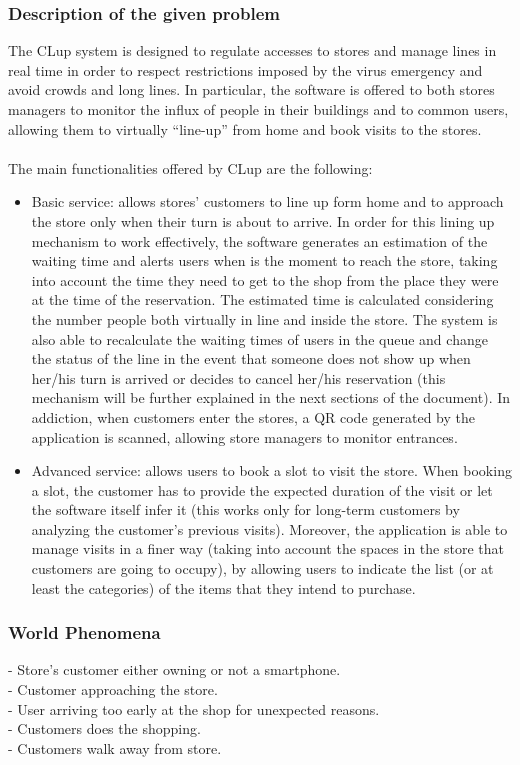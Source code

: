 \documentclass{article}
\begin{document}
\subsubsection{Description of the given problem}
The CLup system is designed to regulate accesses to stores and manage lines in real time in order to respect restrictions imposed by the virus emergency and avoid crowds and long lines. In particular, the software is offered to both stores managers to monitor the influx of people in their buildings and to common users, allowing them to virtually “line-up” from home and book visits to the stores.\\
\smallskip\\
The main functionalities offered by CLup are the following:\\
\begin{itemize}
\item Basic service: allows stores' customers to line up form home and to approach the store only when their turn is about to arrive. In order for this lining up mechanism to work effectively, the software generates an estimation of the waiting time and alerts users when is the moment to reach the store, taking into account the time they need to get to the shop from the place they were at the time of the reservation. The estimated time is calculated considering the number people both virtually in line and inside the store. The system is also able to recalculate the waiting times of users in the queue and change the status of the line in the event that someone does not show up when her/his turn is arrived or decides to cancel her/his reservation (this mechanism will be further explained in the next sections of the document). In addiction, when customers enter the stores, a QR code generated by the application is scanned, allowing store managers to monitor entrances.
\item Advanced service: allows users to book a slot to visit the store. When booking a slot, the customer has to provide the expected duration of the visit or let the software itself infer it (this works only for long-term customers by analyzing the customer’s previous visits). Moreover, the application is able to manage visits in a finer way (taking into account the spaces in the store that customers are going to occupy), by allowing users to indicate the list (or at least the categories) of the items that they intend to purchase.
\end{itemize}
\subsubsection{World Phenomena}
\noindent\medskip
[WP1] - Store's customer either owning or not a smartphone.\\
\noindent\medskip
[WP2] - Customer approaching the store.\\
\noindent\medskip
[WP2] - User arriving too early at the shop for unexpected reasons.\\
\noindent\medskip
[WP3] - Customers does the shopping.\\
\noindent\medskip
[WP4] - Customers walk away from store.
\end{document}
